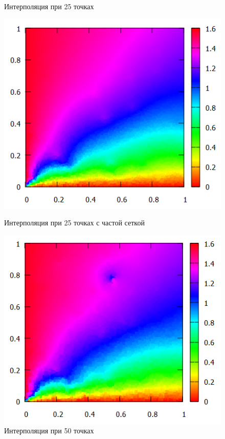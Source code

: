 \documentclass[14pt, a4paper]{extarticle}
\begin{document}
\begin{enumerate}
\begin{figure}[H]
\begin{minipage}{0.5\textwidth}
					\caption[.] {Интерполяция при 25 точках}
				\end{minipage}\hfill
			\end{figure}
			\begin{figure}[H]
				\begin{minipage}{0.5\textwidth}
					\centering
					\includegraphics[width = \linewidth]{../3func/M=25T=10182Err=0.0632562.png}
					\caption[.] {Интерполяция при 25 точках с частой сеткой}
				\end{minipage}\hfill
				\begin{minipage}{0.5\textwidth}
					\centering
					\includegraphics[width = \linewidth]{../3func/M=50T=5774Err=0.0529867.png}
					\caption[.] {Интерполяция при 50 точках}
				\end{minipage}\hfill
			\end{figure}
		

\end{enumerate}
\end{document}
